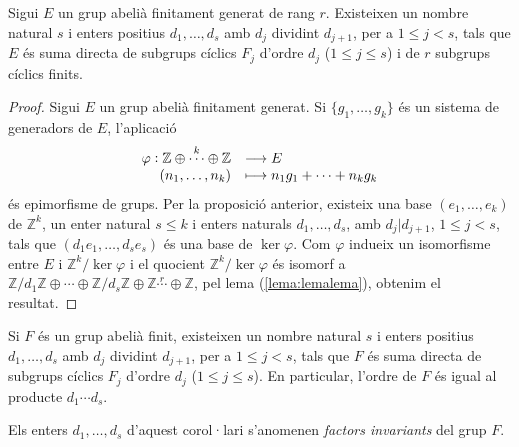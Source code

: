 \documentclass[../main.tex]{subfiles}
\begin{document}
\begin{ter}
 Sigui $E$ un grup abelià finitament generat de rang $r$. Existeixen un nombre natural $s$ i enters positius $d_1,\ldots,d_s$ amb $d_j$ dividint $d_{j+1}$, per a $1\leq j < s$, tals que $E$ és suma directa de subgrups cíclics $F_j$ d'ordre $d_j$ ($1\leq j \leq s$) i de $r$ subgrups cíclics finits.
\end{ter}
\begin{proof}
Sigui $E$ un grup abelià finitament generat. Si $\{g_1,\ldots,g_k\}$ és un sistema de generadors de $E$, l'aplicació
\begin{equation}
    \notag
    \begin{array}{rl}
        \varphi:\mathbb{Z}\oplus\overset{k}{\cdots}\oplus\mathbb{Z} & \longrightarrow E \\
        (n_1,\ldots,n_k) & \longmapsto n_1g_1+\cdots+n_kg_k
    \end{array}
\end{equation}
és epimorfisme de grups. Per la proposició anterior, existeix una base $(e_1,\ldots,e_k)$ de $\mathbb{Z}^k$, un enter natural $s\leq k$ i enters naturals $d_1,\ldots,d_s$, amb $d_j|d_{j+1}$, $1\leq j < s$, tals que $(d_1e_1,\ldots,d_se_s)$ és una base de $\ker \varphi$. Com $\varphi$ indueix un isomorfisme entre $E$ i $\mathbb{Z}^k/\ker\varphi$ i el quocient $\mathbb{Z}^k/\ker\varphi$ és isomorf a $\mathbb{Z}/d_1\mathbb{Z}\oplus \cdots \oplus\mathbb{Z}/d_s\mathbb{Z}\oplus \mathbb{Z}\overset{r}{\cdots}\oplus\mathbb{Z}$, pel lema (\ref{lema:lemalema}), obtenim el resultat.
\end{proof}

\begin{coro}
Si $F$ és un grup abelià finit, existeixen un nombre natural $s$ i enters positius $d_1,\ldots,d_s$ amb $d_j$ dividint $d_{j+1}$, per a $1\leq j< s$, tals que $F$ és suma directa de subgrups cíclics $F_j$ d'ordre $d_j$ ($1\leq j\leq s$). En particular, l'ordre de $F$ és igual al producte $d_1\cdots d_s$.
\end{coro}


\begin{defi}
Els enters $d_1,\ldots,d_s$ d'aquest corol·lari s'anomenen \textit{factors invariants} del grup $F$.
\end{defi}
\end{document}
